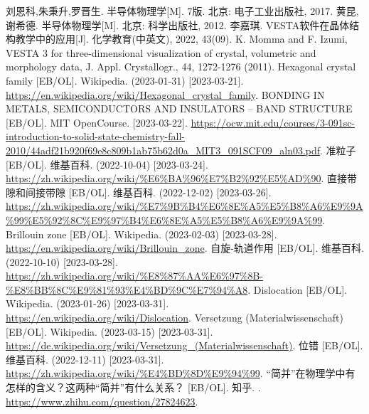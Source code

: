 \begin{thebibliography}{99}%
     刘恩科,朱秉升,罗晋生. 半导体物理学[M]. 7版. 北京: 电子工业出版社, 2017.
     黄昆,谢希德. 半导体物理学[M]. 北京: 科学出版社, 2012.
     李嘉琪. VESTA软件在晶体结构教学中的应用[J]. 化学教育(中英文), 2022, 43(09).
     K. Momma and F. Izumi, VESTA 3 for three-dimensional visualization of crystal, volumetric and morphology data, J. Appl. Crystallogr., 44, 1272-1276 (2011).
     Hexagonal crystal family [EB/OL]. Wikipedia. (2023-01-31) [2023-03-21].\\ \url{https://en.wikipedia.org/wiki/Hexagonal_crystal_family}.
     BONDING IN METALS, SEMICONDUCTORS AND
    INSULATORS – BAND STRUCTURE [EB/OL]. MIT OpenCourse. [2023-03-22]. \url{https://ocw.mit.edu/courses/3-091sc-introduction-to-solid-state-chemistry-fall-2010/44adf21b920f69e8c809b1ab75b62d0a_MIT3_091SCF09_aln03.pdf}.
     准粒子 [EB/OL]. 维基百科. (2022-10-04) [2023-03-24].\\ \url{https://zh.wikipedia.org/wiki/%E6%BA%96%E7%B2%92%E5%AD%90}.
     直接带隙和间接带隙 [EB/OL]. 维基百科. (2022-12-02) [2023-03-26].\\ \url{https://zh.wikipedia.org/wiki/%E7%9B%B4%E6%8E%A5%E5%B8%A6%E9%9A%99%E5%92%8C%E9%97%B4%E6%8E%A5%E5%B8%A6%E9%9A%99}.
     Brillouin zone [EB/OL]. Wikipedia. (2023-02-03) [2023-03-28].\\ \url{https://en.wikipedia.org/wiki/Brillouin_zone}.
     自旋-轨道作用 [EB/OL]. 维基百科. (2022-10-10) [2023-03-28].\\ \url{https://zh.wikipedia.org/wiki/%E8%87%AA%E6%97%8B-%E8%BB%8C%E9%81%93%E4%BD%9C%E7%94%A8}.
     Dislocation [EB/OL]. Wikipedia. (2023-01-26) [2023-03-31].\\ \url{https://en.wikipedia.org/wiki/Dislocation}.
     Versetzung (Materialwissenschaft) [EB/OL]. Wikipedia. (2023-03-15) [2023-03-31].\\ \url{https://de.wikipedia.org/wiki/Versetzung_(Materialwissenschaft)}.
     位错 [EB/OL]. 维基百科. (2022-12-11) [2023-03-31].\\ \url{https://zh.wikipedia.org/wiki/%E4%BD%8D%E9%94%99}.
     “简并”在物理学中有怎样的含义？这两种“简并”有什么关系？ [EB/OL]. 知乎. \newline [2023-04-04]. \url{https://www.zhihu.com/question/27824623}.
    
\end{thebibliography}
